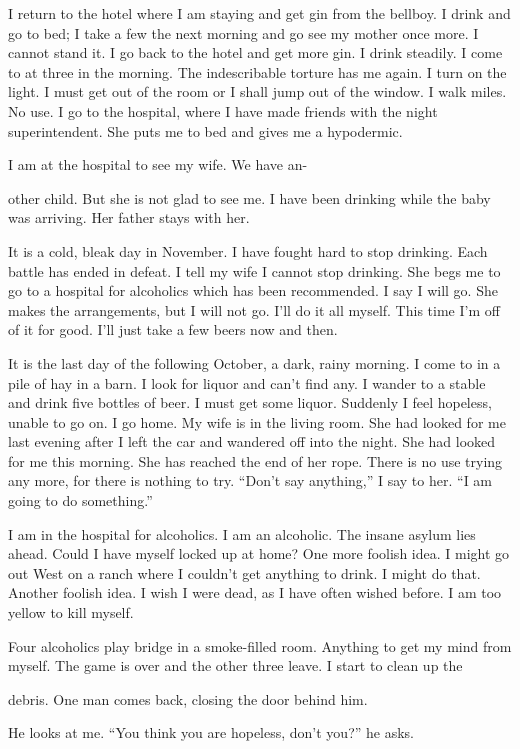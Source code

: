 I return to the hotel where I am staying and get gin from the bellboy. I drink and go to bed; I take a few the next morning and go see my mother once more. I cannot stand it. I go back to the hotel and get more gin. I drink steadily. I come to at three in the morning. The indescribable torture has me again. I turn on the light. I must get out of the room or I shall jump out of the window. I walk miles. No use. I go to the hospital, where I have made friends with the night superintendent. She puts me to bed and gives me a hypodermic.

I am at the hospital to see my wife. We have an-

other child. But she is not glad to see me. I have been drinking while the baby was arriving. Her father stays with her.

It is a cold, bleak day in November. I have fought hard to stop drinking. Each battle has ended in defeat. I tell my wife I cannot stop drinking. She begs me to go to a hospital for alcoholics which has been recommended. I say I will go. She makes the arrangements, but I will not go. I’ll do it all myself. This time I’m off of it for good. I’ll just take a few beers now and then.

It is the last day of the following October, a dark, rainy morning. I come to in a pile of hay in a barn. I look for liquor and can’t find any. I wander to a stable and drink five bottles of beer. I must get some liquor. Suddenly I feel hopeless, unable to go on. I go home. My wife is in the living room. She had looked for me last evening after I left the car and wandered off into the night. She had looked for me this morning. She has reached the end of her rope. There is no use trying any more, for there is nothing to try. “Don’t say anything,” I say to her. “I am going to do something.”

I am in the hospital for alcoholics. I am an alcoholic. The insane asylum lies ahead. Could I have myself locked up at home? One more foolish idea. I might go out West on a ranch where I couldn’t get anything to drink. I might do that. Another foolish idea. I wish I were dead, as I have often wished before. I am too yellow to kill myself.

Four alcoholics play bridge in a smoke-filled room. Anything to get my mind from myself. The game is over and the other three leave. I start to clean up the

debris. One man comes back, closing the door behind him.

He looks at me. “You think you are hopeless, don’t you?” he asks.

